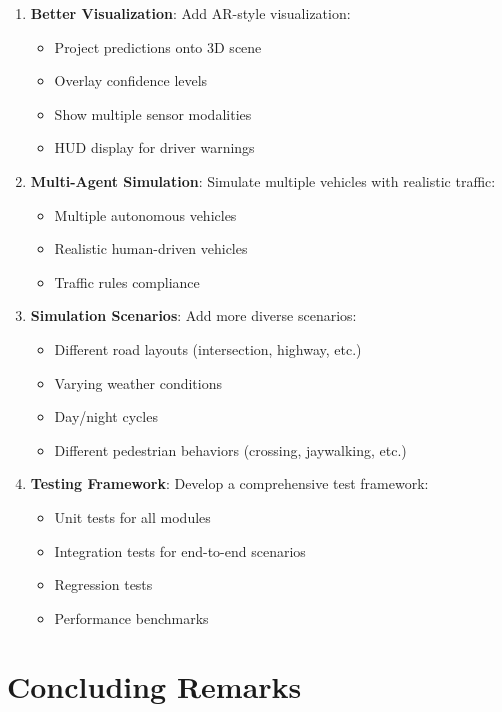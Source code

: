 \begin{enumerate}
    \item \textbf{Better Visualization}: Add AR-style visualization:
    \begin{itemize}
        \item Project predictions onto 3D scene
        \item Overlay confidence levels
        \item Show multiple sensor modalities
        \item HUD display for driver warnings
    \end{itemize}
    
    \item \textbf{Multi-Agent Simulation}: Simulate multiple vehicles with realistic traffic:
    \begin{itemize}
        \item Multiple autonomous vehicles
        \item Realistic human-driven vehicles
        \item Traffic rules compliance
    \end{itemize}
    
    \item \textbf{Simulation Scenarios}: Add more diverse scenarios:
    \begin{itemize}
        \item Different road layouts (intersection, highway, etc.)
        \item Varying weather conditions
        \item Day/night cycles
        \item Different pedestrian behaviors (crossing, jaywalking, etc.)
    \end{itemize}
    
    \item \textbf{Testing Framework}: Develop a comprehensive test framework:
    \begin{itemize}
        \item Unit tests for all modules
        \item Integration tests for end-to-end scenarios
        \item Regression tests
        \item Performance benchmarks
    \end{itemize}
\end{enumerate}

\section{Concluding Remarks}

